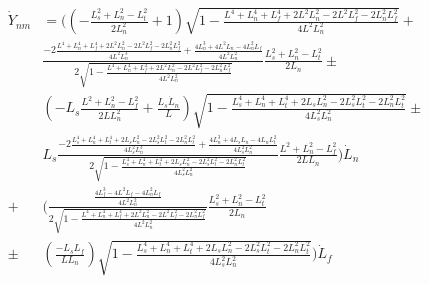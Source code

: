 \documentclass[11pt, landscape]{article}
\begin{document}
\begin{align}
    \dot{Y}_{nm} &=
    \Bigg(\left(-\frac{L_{s}^2+L_{n}^2-L_{t}^2}{2L_n^2} + 1\right)\sqrt{1-\frac{L^4 + L_n^4 + L_f^4 + 2L^2L_n^2 - 2L^2L_f^2 - 2L_n^2L_f^2}{4L^2L_n^2}} +\\
    &\frac{-2\frac{L^4 + L_n^4 + L_f^4 + 2L^2L_n^2 - 2L^2L_f^2 - 2L_n^2L_f^2}{4L^2L_n^3} + \frac{4L_n^3 + 4L^2L_n - 4L_n^2L_f}{4L^2L_n^2}}{2\sqrt{1-\frac{L^4 + L_n^4 + L_f^4 + 2L^2L_n^2 - 2L^2L_f^2 - 2L_n^2L_f^2}{4L^2L_n^2}}}\frac{L_{s}^2+L_{n}^2-L_{t}^2}{2L_{n}} \pm\\
    &\left(-L_s\frac{L^2+L_{n}^2-L_{f}^2}{2LL_{n}^2} + \frac{L_s\dot{L}_n}{L}\right)\sqrt{1-\frac{L_s^4 + L_n^4 + L_t^4 + 2L_sL_n^2 - 2L_s^2L_t^2 - 2L_n^2L_t^2}{4L_s^2L_n^2}} \pm\\
    &L_s\frac{-2\frac{L_s^4 + L_n^4 + L_t^4 + 2L_sL_n^2 - 2L_s^2L_t^2 - 2L_n^2L_t^2}{4L_s^2L_n^3} + \frac{4L_n^3 + 4L_sL_n - 4L_nL_t^2}{4L_s^2L_n^2}}{2\sqrt{1-\frac{L_s^4 + L_n^4 + L_t^4 + 2L_sL_n^2 - 2L_s^2L_t^2 - 2L_n^2L_t^2}{4L_s^2L_n^2}}}\frac{L^2+L_{n}^2-L_{f}^2}{2LL_{n}}\Bigg)\dot{L}_n\\
    + &\Bigg(\frac{\frac{4L_f^3 - 4L^2L_f - 4L_n^2L_f}{4L^2L_n^2}}{2\sqrt{1-\frac{L^4 + L_n^4 + L_f^4 + 2L^2L_n^2 - 2L^2L_f^2 - 2L_n^2L_f^2}{4L^2L_n^2}}}\frac{L_{s}^2+L_{n}^2-L_{t}^2}{2L_{n}}\\
    \pm &\left(\frac{-L_sL_{f}}{LL_{n}}\right)\sqrt{1-\frac{L_s^4 + L_n^4 + L_t^4 + 2L_sL_n^2 - 2L_s^2L_t^2 - 2L_n^2L_t^2}{4L_s^2L_n^2}}\Bigg)\dot{L}_f\\
\end{align}
\end{document}

